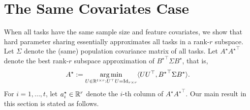 \section{The Same Covariates Case}\label{sec_same}

When all tasks have the same sample size and feature covariates, we show that hard parameter sharing essentially approximates all tasks in a rank-$r$ subspace.
Let $\Sigma$ denote the (same) population covariance matrix of all tasks.
Let $A^{\star} {A^{\star}}^{\top}$ denote the best rank-$r$ subspace approximation of ${B^{\star}}^\top\Sigma B^{\star}$, that is,
\[ A^{\star} := \operatorname*{arg\,min}_{U\in\mathbb{R}^{t\times r} : U^{\top} U = \operatorname{Id}_{r\times r}} \langle U U^{\top}, {B^{\star}}^{\top} \Sigma B^{\star} \rangle. \]
For $i = 1,\dots, t$, let $a_i^{\star} \in\mathbb{R}^r$ denote the $i$-th column of $A^{\star}{A^{\star}}^{\top}$.
Our main result in this section is stated as follows.

